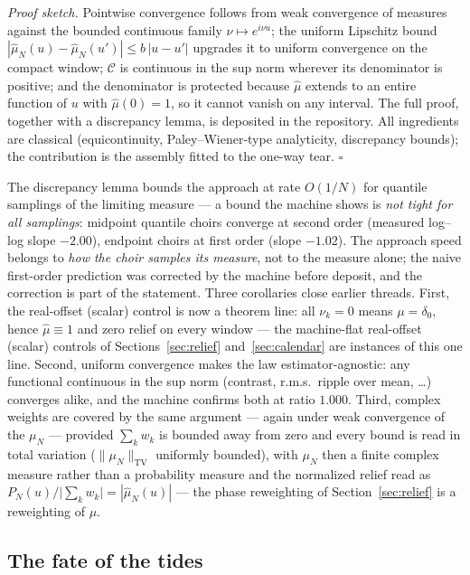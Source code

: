 \documentclass[11pt,a4paper]{article}
\begin{document}
\medskip\noindent
\emph{Proof sketch.} Pointwise convergence follows from weak convergence
of measures against the bounded continuous family
$\nu \mapsto e^{i\nu u}$; the uniform Lipschitz bound
$|\hat{\mu}_N(u) - \hat{\mu}_N(u')| \le b\,|u - u'|$ upgrades it to
uniform convergence on the compact window; $\mathcal{C}$ is continuous in the sup
norm wherever its denominator is positive; and the denominator is
protected because $\hat{\mu}$ extends to an entire function of $u$ with
$\hat{\mu}(0) = 1$, so it cannot vanish on any interval. The full proof,
together with a discrepancy lemma, is deposited in the repository. All
ingredients are classical (equicontinuity, Paley--Wiener-type
analyticity, discrepancy bounds); the contribution is the assembly
fitted to the one-way tear. \hfill$\square$

\medskip
The discrepancy lemma bounds the approach at rate $O(1/N)$ for quantile
samplings of the limiting measure --- a bound the machine shows is
\emph{not tight for all samplings}: midpoint quantile choirs converge at
second order (measured log--log slope $-2.00$), endpoint choirs at first
order (slope $-1.02$). The approach speed belongs to \emph{how the choir
samples its measure}, not to the measure alone; the naive first-order
prediction was corrected by the machine before deposit, and the
correction is part of the statement. Three corollaries close earlier
threads. First, the real-offset (scalar) control is now a theorem line: all
$\nu_k = 0$ means $\mu = \delta_0$, hence $\hat{\mu} \equiv 1$ and zero
relief on every window --- the machine-flat real-offset (scalar) controls of
Sections~\ref{sec:relief} and~\ref{sec:calendar} are instances of this
one line. Second, uniform convergence makes the law
estimator-agnostic: any functional continuous in the sup norm (contrast,
r.m.s.\ ripple over mean, \dots) converges alike, and the machine
confirms both at ratio $1.000$. Third, complex weights are covered
by the same argument --- again under weak convergence of the $\mu_N$ ---
provided $\sum_k w_k$ is bounded away from zero and
every bound is read in total variation ($\|\mu_N\|_{\mathrm{TV}}$ uniformly
bounded), with $\mu_N$ then a finite complex measure rather than a
probability measure and the normalized relief read as
$P_N(u)/\bigl|\sum_k w_k\bigr| = |\hat{\mu}_N(u)|$ --- the phase reweighting
of Section~\ref{sec:relief} is a reweighting of $\mu$.

\subsection{The fate of the tides}
\label{sec:tides}
\end{document}
